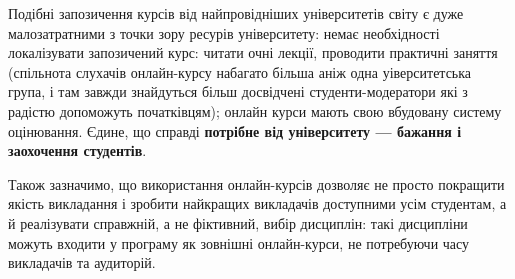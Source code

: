 \documentclass[14pt, a4paper]{extarticle}  %
\begin{document}
Подібні запозичення курсів від найпровідніших університетів світу є дуже малозатратними з точки зору ресурів університету: немає необхідності локалізувати запозичений курс: читати очні лекції, проводити практичні заняття (спільнота слухачів онлайн-курсу набагато більша аніж одна уіверситетська група, і там завжди знайдуться більш досвідчені студенти-модератори які з радістю допоможуть початківцям); онлайн курси мають свою вбудовану систему оцінювання. Єдине, що справді \textbf{потрібне від університету --- бажання і заохочення студентів}.

Також зазначимо, що використання онлайн-курсів дозволяє не просто покращити якість викладання і зробити найкращих викладачів доступними усім студентам, а й реалізувати справжній, а не фіктивний, вибір дисциплін: такі дисципліни можуть входити у програму як зовнішні онлайн-курси, не потребуючи часу викладачів та аудиторій. 
\end{document}
